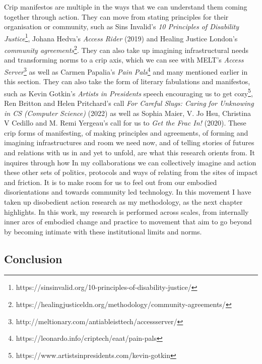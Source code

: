 Crip manifestos are multiple in the ways that we can understand them
coming together through action. They can move from stating principles
for their organisation or community, such as Sins Invalid's \emph{10
Principles of Disability Justice}\footnote{https://sinsinvalid.org/10-principles-of-disability-justice/},
Johana Hedva's \emph{Access Rider} (2019) and Healing Justice London's
\emph{community agreements}\footnote{https://healingjusticeldn.org/methodology/community-agreements/}.
They can also take up imagining infrastructural needs and transforming
norms to a crip axis, which we can see with MELT's \emph{Access
Server}\footnote{http://meltionary.com/antiableisttech/accessserver/} as
well as Carmen Papalia's \emph{Pain Pals}\footnote{https://leonardo.info/criptech/eaat/pain-pals}
and many mentioned earlier in this section. They can also take the form
of literary fabulations and manifestos, such as Kevin Gotkin's
\emph{Artists in Presidents} speech encouraging us to get
cozy\footnote{https://www.artistsinpresidents.com/kevin-gotkin}, Ren
Britton and Helen Pritchard's call \emph{For Careful Slugs: Caring for
Unknowing in CS (Computer Science)} (2022) as well as Sophia Maier, V.
Jo Hsu, Christina V Cedillo and M. Remi Yergeau's call for us to
\emph{Get the Frac In!} (2020). These crip forms of manifesting, of
making principles and agreements, of forming and imagining
infrastructures and room we need now, and of telling stories of futures
and relations with us in and yet to unfold, are what this research
orients from. It inquires through how In my collaborations we can
collectively imagine and action these other sets of politics, protocols
and ways of relating from the sites of impact and friction. It is to
make room for us to feel out from our embodied disorientations and
towards community led technology. In this movement I have taken up
disobedient action research as my methodology, as the next chapter
highlights. In this work, my research is performed across scales, from
internally inner arcs of embodied change and practice to movement that
aim to go beyond by becoming intimate with these institutional limits
and norms.

\hypertarget{conclusion}{%
\subsection[Conclusion]{\texorpdfstring{\protect\hypertarget{anchor}{}{}Conclusion}{Conclusion}}\label{conclusion}}


